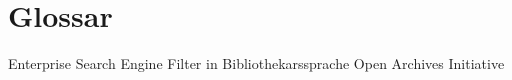 \chapter{Glossar}

      {Enterprise Search Engine}
 {Filter in Bibliothekarssprache}
 {Open Archives Initiative}
